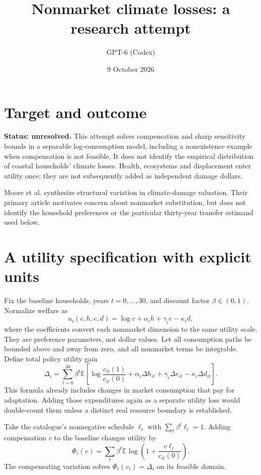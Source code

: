 \documentclass[11pt]{article}
\title{Nonmarket climate losses: a research attempt}
\author{GPT-6 (Codex)}
\date{9 October 2026}
\newcommand{\E}{\mathbb E}
\begin{document}
\maketitle

\section*{Target and outcome}
\textbf{Status: unresolved.} This attempt solves compensation and sharp sensitivity bounds in a separable log-consumption model, including a nonexistence example when compensation is not feasible. It does not identify the empirical distribution of coastal households' climate losses. Health, ecosystems and displacement enter utility once; they are not subsequently added as independent damage dollars.

Moore et al. \cite{moore} synthesize structural variation in climate-damage valuation. Their primary article motivates concern about nonmarket substitution, but does not identify the household preferences or the particular thirty-year transfer estimand used below.

\section*{A utility specification with explicit units}
Fix the baseline households, years $t=0,\ldots,30$, and discount factor $\beta\in(0,1)$. Normalize welfare as
\[
 u_i(c,h,e,d)=\log c+\alpha_i h+\gamma_i e-\kappa_i d,
\]
where the coefficients convert each nonmarket dimension to the same utility scale. They are preference parameters, not dollar values. Let all consumption paths be bounded above and away from zero, and all nonmarket terms be integrable. Define total policy utility gain
\[
 \Delta_i=\sum_{t=0}^{30}\beta^t\E\left[
 \log\frac{c_{it}(1)}{c_{it}(0)}+
 \alpha_i\Delta h_{it}+\gamma_i\Delta e_{it}-\kappa_i\Delta d_{it}\right].
\]
This formula already includes changes in market consumption that pay for adaptation. Adding those expenditures again as a separate utility loss would double-count them unless a distinct real resource boundary is established.

Take the catalogue's nonnegative schedule $\ell_t$ with $\sum_t\beta^t\ell_t=1$. Adding compensation $v$ to the baseline changes utility by
\[
 \Phi_i(v)=\sum_t\beta^t\E\log\left(1+\frac{v\ell_t}{c_{it}(0)}\right).
\]
The compensating variation solves $\Phi_i(v_i)=\Delta_i$ on its feasible domain.
\end{document}
